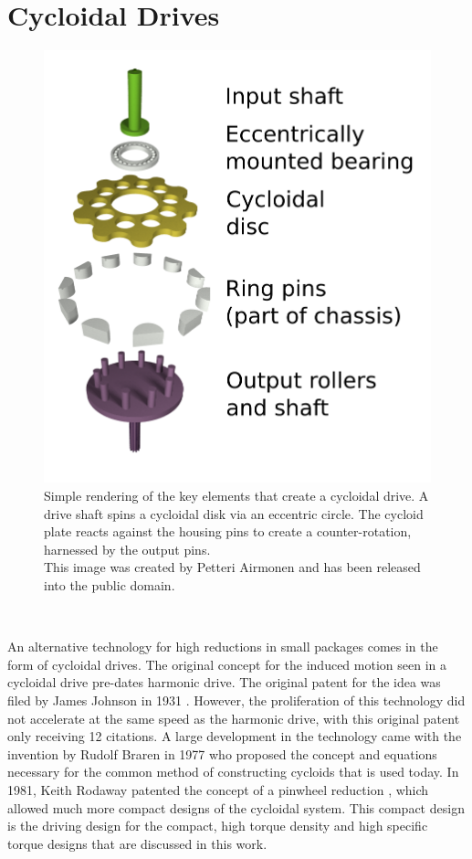 \section{Cycloidal Drives} \label{intro:cycloid}

\begin{figure}[h]
   \centering
   \includegraphics[width=0.40\linewidth]{fig/Cycloidal_drive_parts}
   \caption{Simple rendering of the key elements that create a cycloidal drive.
   A drive shaft spins a cycloidal disk via an eccentric circle.
   The cycloid plate reacts against the housing pins to create a counter-rotation, harnessed by the output pins. 
   \\This image was created by Petteri Airmonen and has been released into the public domain.}
   \label{fig:cycloid_cartoon}
\end{figure}
\\

An alternative technology for high reductions in small packages comes in the form of cycloidal drives. The original concept for the induced motion seen in a cycloidal drive pre-dates harmonic drive. The original patent for the idea was filed by James Johnson in 1931 \cite{ref:cycloid_original}. However, the proliferation of this technology did not accelerate at the same speed as the harmonic drive, with this original patent only receiving 12 citations. A large development in the technology came with the invention by Rudolf Braren in 1977 \cite{ref:cycloid_one_stage} who proposed the concept and equations necessary for the common method of constructing cycloids that is used today. In 1981, Keith Rodaway patented the concept of a pinwheel reduction \cite{ref:cycloid_pinwheel}, which allowed much more compact designs of the cycloidal system. This compact design is the driving design for the compact, high torque density and high specific torque designs that are discussed in this work.

